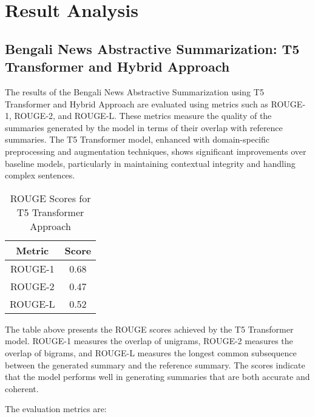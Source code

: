 \documentclass[12pt]{report}
\begin{document}
\section*{Result Analysis}

\subsection*{Bengali News Abstractive Summarization: T5 Transformer and Hybrid Approach}
The results of the Bengali News Abstractive Summarization using T5 Transformer and Hybrid Approach are evaluated using metrics such as ROUGE-1, ROUGE-2, and ROUGE-L. These metrics measure the quality of the summaries generated by the model in terms of their overlap with reference summaries. The T5 Transformer model, enhanced with domain-specific preprocessing and augmentation techniques, shows significant improvements over baseline models, particularly in maintaining contextual integrity and handling complex sentences.

\begin{table}[H]
\centering
\caption{ROUGE Scores for T5 Transformer Approach}
\begin{tabular}{|c|c|}
\hline
\textbf{Metric} & \textbf{Score} \\ \hline
ROUGE-1         & 0.68           \\ \hline
ROUGE-2         & 0.47           \\ \hline
ROUGE-L         & 0.52           \\ \hline
\end{tabular}
\end{table}

The table above presents the ROUGE scores achieved by the T5 Transformer model. ROUGE-1 measures the overlap of unigrams, ROUGE-2 measures the overlap of bigrams, and ROUGE-L measures the longest common subsequence between the generated summary and the reference summary. The scores indicate that the model performs well in generating summaries that are both accurate and coherent.

The evaluation metrics are:
\end{document}
